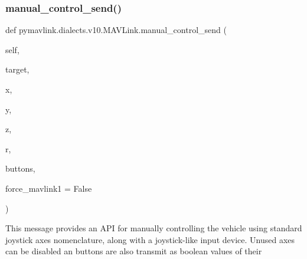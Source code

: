 \begin{DoxyVerb}
\begin{DoxyVerb}
\begin{DoxyVerb}
\begin{DoxyVerb}
\subsubsection{\texorpdfstring{manual\+\_\+control\+\_\+send()}{manual\_control\_send()}}
{\footnotesize\ttfamily def pymavlink.\+dialects.\+v10.\+M\+A\+V\+Link.\+manual\+\_\+control\+\_\+send (\begin{DoxyParamCaption}\item[{}]{self,  }\item[{}]{target,  }\item[{}]{x,  }\item[{}]{y,  }\item[{}]{z,  }\item[{}]{r,  }\item[{}]{buttons,  }\item[{}]{force\+\_\+mavlink1 = {\ttfamily False} }\end{DoxyParamCaption})}

\begin{DoxyVerb}This message provides an API for manually controlling the vehicle
using standard joystick axes nomenclature, along with
a joystick-like input device. Unused axes can be
disabled an buttons are also transmit as boolean
values of their


\end{DoxyVerb}
\end{DoxyVerb}
\end{DoxyVerb}
\end{DoxyVerb}
\end{DoxyVerb}
